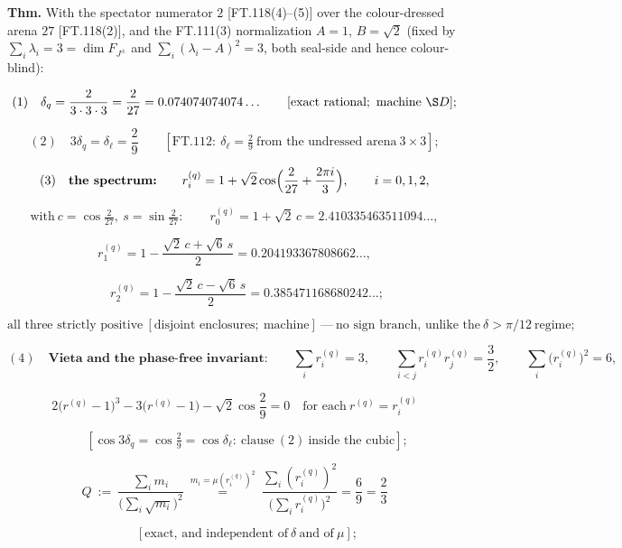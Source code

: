 \begin{theorem}[{\texorpdfstring{FT.119 — The triplet-attached mixing angle $\delta_q=2/27$ and its spectrum}{FT.119 - The triplet-attached mixing angle and its spectrum}}]\label{tag:FT-119}
\textbf{Thm.} With the spectator numerator $2$ [FT.118(4)–(5)] over the colour-dressed arena $27$ [FT.118(2)], and the FT.111(3) normalization $A=1$, $B=\sqrt2$ (fixed by $\sum_i\lambda_i=3=\dim F_{J^\pm}$ and $\sum_i(\lambda_i-A)^2=3$, both seal-side and hence colour-blind):

\[
(1)\quad\delta_q=\frac{2}{3\cdot3\cdot3}=\frac2{27}=0.074074074074\ldots\qquad[\text{exact rational};\ \text{machine}\ \S D];
\]

\[
(2)\quad3\delta_q=\delta_\ell=\frac29\qquad[\mathrm{FT.112}:\ \delta_\ell=\tfrac2{9}\ \text{from the undressed arena}\ 3\times3];
\]

\[
(3)\quad\textbf{the spectrum:}\qquad r^{(q)}_i=1+\sqrt2\cos\Bigl(\frac2{27}+\frac{2\pi i}3\Bigr),\qquad i=0,1,2,
\]

\[
\text{with}\ c=\cos\tfrac2{27},\ s=\sin\tfrac2{27}:\qquad r^{(q)}_0=1+\sqrt2\,c=2.410335463511094\ldots,
\]

\[
r^{(q)}_1=1-\frac{\sqrt2\,c+\sqrt6\,s}{2}=0.204193367808662\ldots,
\]

\[
\qquad r^{(q)}_2=1-\frac{\sqrt2\,c-\sqrt6\,s}{2}=0.385471168680242\ldots;
\]

\[
\text{all three strictly positive}\ [\text{disjoint enclosures};\ \text{machine}]\ —\ \text{no sign branch, unlike the}\ \delta>\pi/12\ \text{regime};
\]

\[
(4)\quad\textbf{Vieta and the phase-free invariant:}\qquad\sum_ir^{(q)}_i=3,\qquad\sum_{i<j}r^{(q)}_ir^{(q)}_j=\frac32,\qquad\sum_i\bigl(r^{(q)}_i\bigr)^2=6,
\]

\[
2\bigl(r^{(q)}-1\bigr)^3-3\bigl(r^{(q)}-1\bigr)-\sqrt2\cos\frac29=0\quad\text{for each}\ r^{(q)}=r^{(q)}_i
\]

\[
\qquad [\cos3\delta_q=\cos\tfrac29=\cos\delta_\ell:\ \text{clause}\ (2)\ \text{inside the cubic}];
\]

\[
Q\ :=\ \frac{\sum_im_i}{\bigl(\sum_i\sqrt{m_i}\bigr)^2}\ \overset{m_i=\mu (r^{(q)}_i)^2}{=}\ \frac{\sum_i(r^{(q)}_i)^2}{\bigl(\sum_ir^{(q)}_i\bigr)^2}=\frac6{9}=\frac23
\]

\[
\qquad [\text{exact, and independent of}\ \delta\ \text{and of}\ \mu];
\]


\end{theorem}

